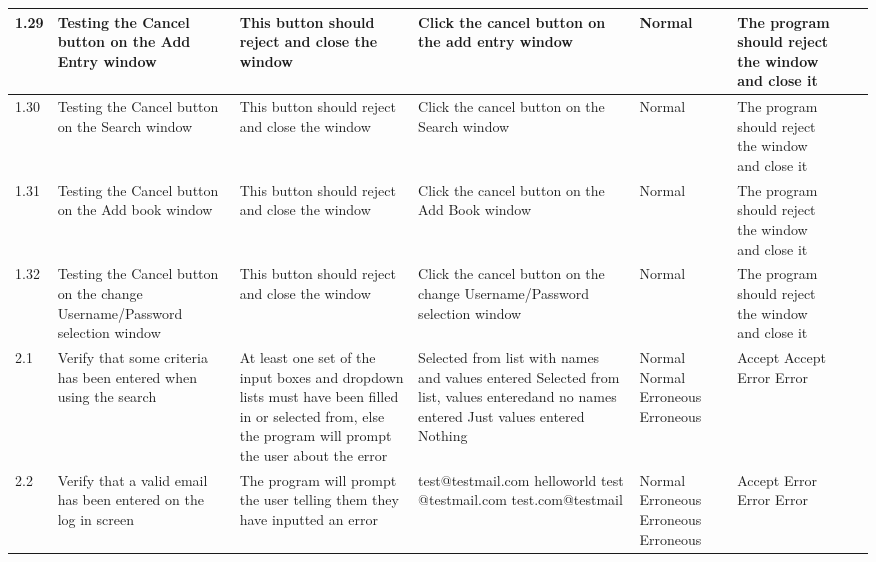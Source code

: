 \begin{landscape}
\begin{center}
\begin{longtable}{|p{1.5cm}|p{2cm}|p{2.5cm}|p{2.5cm}|p{2cm}|p{2cm}|p{2cm}|p{2cm}|}
\rowcolor{lightgray} 1.29 & Testing the Cancel button on the Add Entry window & This button should reject and close the window & Click the cancel button on the add entry window & Normal & The program should reject the window and close it & & \\ \hline
\rowcolor{lightgray} 1.30 & Testing the Cancel button on the Search window & This button should reject and close the window & Click the cancel button on the Search window & Normal & The program should reject the window and close it & & \\ \hline
\rowcolor{lightgray} 1.31 & Testing the Cancel button on the Add book window & This button should reject and close the window & Click the cancel button on the Add Book window & Normal & The program should reject the window and close it & & \\ \hline
\rowcolor{lightgray} 1.32 & Testing the Cancel button on the change Username/Password selection window & This button should reject and close the window & Click the cancel button on the change Username/Password selection window & Normal & The program should reject the window and close it & & \\ \hline
        2.1 & Verify that some criteria has been entered when using the search & At least one set of the input boxes and dropdown lists must have been filled in or selected from, else the program will prompt the user about the error & Selected from list with names and values entered \newline Selected from list, values enteredand no names entered \newline Just values entered \newline Nothing   & Normal \newline Normal \newline Erroneous \newline Erroneous & Accept \newline Accept \newline Error \newline Error & & \\ \hline
        2.2 & Verify that a valid email has been entered on the log in screen &  The program will prompt the user telling them they have inputted an error & test@testmail.com \newline helloworld \newline test @testmail.com \newline test.com@testmail & Normal \newline Erroneous \newline Erroneous \newline Erroneous & Accept \newline Error \newline Error \newline Error & & \\ \hline

\end{longtable}
\end{center}
\end{landscape}

